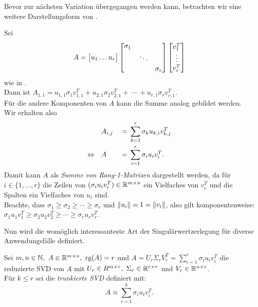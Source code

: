 Bevor zur nächsten Variation übergegangen werden kann, betrachten wir eine weitere Darstellungsform von .
\begin{remark}\label{rem:onesvd}
    Sei
    \begin{equation*}
        A = 
        \big[
            \begin{matrix}
                u_1 \dots u_{r}
            \end{matrix}
        \big]
        \begin{bmatrix}
            \sigma_1 &  & \\
              &  \rotatebox{12}{\(\ddots\)} &  \\
              &  &  \sigma_r \\
        \end{bmatrix}
        \begin{bmatrix}
            v^{T}_1 \\
            \vdots \\
            v^{T}_r \\
        \end{bmatrix}
    \end{equation*}
    wie in . \\
    Dann ist \(A_{1,1} = u_{1,1} \sigma_1 v^{T}_{1,1} + u_{2,1} \sigma_2 v^{T}_{2,1} +\ \cdots \ + u_{r,1} \sigma_r v^{T}_{r,1} \). \\
    Für die andere Komponenten von \(A\) kann die Summe analog gebildet werden. 
    Wir erhalten also
    \begin{alignat*}{2}
        &A_{i,j} &{}={}& \sum_{k=1}^{r} \sigma_k u_{k,i} v^{T}_{k,j}  \\
        \Leftrightarrow \quad &A &{}={}& \sum_{i=1}^{r} \sigma_i u_i v^{T}_i.
    \end{alignat*}
    Damit kann \(A\) als \textit{Summe von Rang-\num{1}-Matrizen} dargestellt werden, da für \(i \in \{1,\ldots,r\}\) die Zeilen von \((\sigma_i u_i v^{T}_i)\in \mathbb{R}^{m \times n}\) ein Vielfaches von \(v^{T}_i\) und die Spalten ein Vielfaches von \(u_i\) sind. \\
    Beachte, dass \(\sigma_1 \geq \sigma_2 \geq \cdots \geq \sigma_r\) und \(\lVert u_i\rVert=1=\lVert v_i\rVert\), also gilt komponentenweise: \(\sigma_1 u_1 v^{T}_1 \geq \sigma_2 u_2 v^{T}_2 \geq \cdots \geq \sigma_r u_r v^{T}_r\). 
\end{remark}
Nun wird die womöglich interessanteste Art der Singulärwertzerlegung für diverse Anwendungsfälle definiert.
\begin{definition}\label{df:trunsvd}
    Sei \(m,n \in \N,\ A \in \R^{m \times n},\ \text{rg}(A)=r\) und \(A=U_r \Sigma_r V^{T}_r = \sum_{i=1}^{r} \sigma_i u_i v^{T}_i\) die reduzierte SVD von \(A\) mit \(U_r \in R^{m \times r},\ \Sigma_r \in \mathbb{R}^{r \times r}\) und \(V_r \in \mathbb{R}^{n \times r}\). \\
    Für \(k \leq r\) sei die \textit{trunkierte SVD} definiert mit:
    \begin{equation*}
        A \approx \sum_{i=1}^{k} \sigma_i u_i v^{T}_i.
    \end{equation*}
\end{definition}
